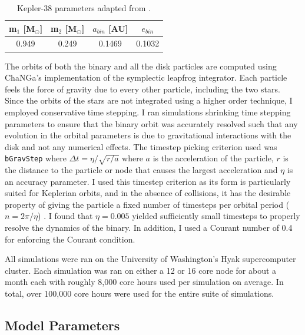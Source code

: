 \begin{table}
	\centering
	\caption{Kepler-38 parameters adapted from \citet{Orosz2012}.}
	\begin{tabular}{cccc} %
		\hline
		m$_1$ [M$_{\odot}$] & m$_2$ [M$_{\odot}$] & $a_{bin}$ [AU] & $e_{bin}$\\
		\hline
		0.949 & 0.249 & 0.1469 & 0.1032\\
		\hline
	\end{tabular}
	\label{tab:CBDisk_table_1}
\end{table}

The orbits of both the binary and all the disk particles are computed using ChaNGa's implementation of the 
symplectic leapfrog integrator.  Each particle feels the force of gravity due to every other particle, including
the two stars.  Since the orbits of the stars are not integrated using a higher order technique, I employed conservative
time stepping.  I ran simulations shrinking time stepping parameters to 
ensure that the binary orbit was accurately resolved such that any evolution in the orbital parameters is due to 
gravitational interactions with the disk and not any numerical
effects.  The timestep picking criterion used was {\tt bGravStep} where  
$\Delta t = \eta/\sqrt{r/a}$ where $a$ is the acceleration of the
particle, $r$ is the distance to the particle or node that causes the largest
acceleration and $\eta$ is an accuracy parameter.  I used this timestep criterion as its form is particularly suited for Keplerian orbits, and in the absence of collisions, it has the desirable property of giving the particle a fixed number of timesteps per orbital period ($n = 2\pi/ \eta$) \citep{Richardson2000}.  I found that 
$\eta = 0.005$ yielded sufficiently small timesteps to properly
resolve the dynamics of the binary.  In addition, I used a Courant number of
0.4 for enforcing the Courant condition.

All simulations were ran on the University of Washington's Hyak supercomputer cluster.  Each simulation was ran on either a 12 or 16 core node for about a month each with roughly 8,000 core hours used per simulation on average.  In total, over 100,000 core hours were used for the entire suite of simulations.

\subsection{Model Parameters}

